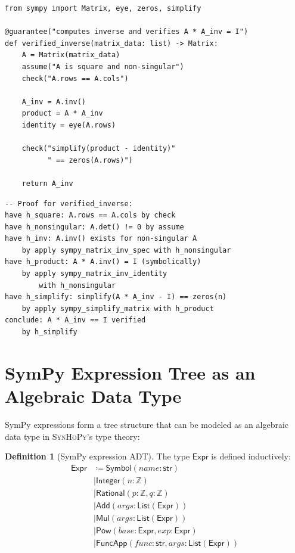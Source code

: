 \documentclass[11pt,a4paper]{report}
\theoremstyle{definition}
\newtheorem{definition}{Definition}[chapter]
\theoremstyle{plain}
\newcommand{\Int}{\mathbb{Z}}
\newcommand{\defeq}{\coloneqq}
\newcommand{\synhopy}{\textsc{SynHoPy}}
\begin{document}
\begin{lstlisting}[style=synhopy]
from sympy import Matrix, eye, zeros, simplify

@guarantee("computes inverse and verifies A * A_inv = I")
def verified_inverse(matrix_data: list) -> Matrix:
    A = Matrix(matrix_data)
    assume("A is square and non-singular")
    check("A.rows == A.cols")

    A_inv = A.inv()
    product = A * A_inv
    identity = eye(A.rows)

    check("simplify(product - identity)"
          " == zeros(A.rows)")

    return A_inv
\end{lstlisting}

\begin{lstlisting}[style=proof]
-- Proof for verified_inverse:
have h_square: A.rows == A.cols by check
have h_nonsingular: A.det() != 0 by assume
have h_inv: A.inv() exists for non-singular A
    by apply sympy_matrix_inv_spec with h_nonsingular
have h_product: A * A.inv() = I (symbolically)
    by apply sympy_matrix_inv_identity
        with h_nonsingular
have h_simplify: simplify(A * A_inv - I) == zeros(n)
    by apply sympy_simplify_matrix with h_product
conclude: A * A_inv == I verified
    by h_simplify
\end{lstlisting}

\section{SymPy Expression Tree as an Algebraic Data Type}

SymPy expressions form a tree structure that can be modeled as an
algebraic data type in \synhopy{}'s type theory:

\begin{definition}[SymPy expression ADT]
The type $\mathsf{Expr}$ is defined inductively:
\begin{align}
  \mathsf{Expr} &\defeq \mathsf{Symbol}(\mathit{name} : \mathsf{str}) \\
    &\mid \mathsf{Integer}(n : \Int) \\
    &\mid \mathsf{Rational}(p : \Int, q : \Int) \\
    &\mid \mathsf{Add}(\mathit{args} : \mathsf{List}(\mathsf{Expr})) \\
    &\mid \mathsf{Mul}(\mathit{args} : \mathsf{List}(\mathsf{Expr})) \\
    &\mid \mathsf{Pow}(\mathit{base} : \mathsf{Expr}, \mathit{exp} : \mathsf{Expr}) \\
    &\mid \mathsf{FuncApp}(\mathit{func} : \mathsf{str}, \mathit{args} : \mathsf{List}(\mathsf{Expr}))
\end{align}
\end{definition}
\end{document}
